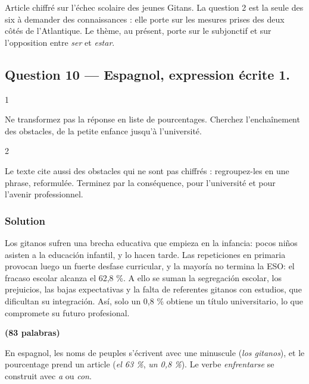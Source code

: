 \documentclass[11pt,a4paper]{article}
\begin{document}
Article chiffré sur l'échec scolaire des jeunes Gitans. La question 2 est la seule des six à demander des connaissances : elle porte sur les mesures prises des deux côtés de l'Atlantique. Le thème, au présent, porte sur le subjonctif et sur l'opposition entre \emph{ser} et \emph{estar}.

\hypertarget{question-10-espagnol-expression-uxe9crite-1.}{%
\subsection{Question 10 --- Espagnol, expression écrite 1.}\label{question-10-espagnol-expression-uxe9crite-1.}}

\begin{indication}{1}

Ne transformez pas la réponse en liste de pourcentages. Cherchez l'enchaînement des obstacles, de la petite enfance jusqu'à l'université.

\end{indication}

\begin{indication}{2}

Le texte cite aussi des obstacles qui ne sont pas chiffrés : regroupez-les en une phrase, reformulée. Terminez par la conséquence, pour l'université et pour l'avenir professionnel.

\end{indication}

\hypertarget{solution-9}{%
\subsubsection{Solution}\label{solution-9}}

Los gitanos sufren una brecha educativa que empieza en la infancia: pocos niños asisten a la educación infantil, y lo hacen tarde. Las repeticiones en primaria provocan luego un fuerte desfase curricular, y la mayoría no termina la ESO: el fracaso escolar alcanza el 62,8 \%. A ello se suman la segregación escolar, los prejuicios, las bajas expectativas y la falta de referentes gitanos con estudios, que dificultan su integración. Así, solo un 0,8 \% obtiene un título universitario, lo que compromete su futuro profesional.

\textbf{(83 palabras)}

\begin{piege}

En espagnol, les noms de peuples s'écrivent avec une minuscule (\emph{los gitanos}), et le pourcentage prend un article (\emph{el 63 \%}, \emph{un 0,8 \%}). Le verbe \emph{enfrentarse} se construit avec \emph{a} ou \emph{con}.

\end{piege}
\end{document}
